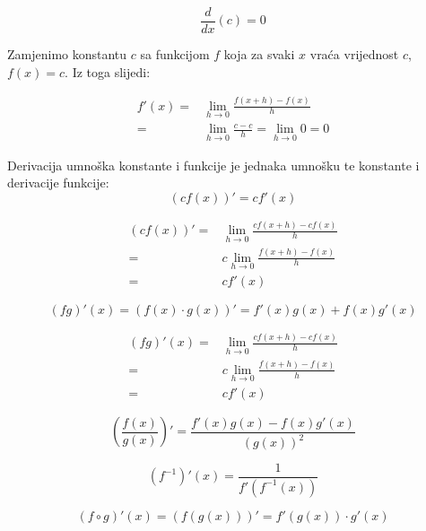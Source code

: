 \begin{multicols}{2}
\begin{propositionbox}
    $$
        \frac{d}{dx}(c) = 0
    $$
\end{propositionbox}

Zamjenimo konstantu $c$ sa funkcijom $f$ koja za svaki $x$ vraća vrijednost $c$, $f(x)=c$.
Iz toga slijedi:

\begin{align*}
    f'(x) =& \lim_{h\to 0}\frac{f(x+h)-f(x)}{h}\\
          =& \lim_{h\to 0}\frac{c - c}{h} = \lim_{h\to 0}0 = 0
\end{align*}

\begin{propositionbox}
    Derivacija umnoška konstante i funkcije je jednaka umnošku te konstante i derivacije funkcije:
    $$
        (cf(x))' = cf'(x)
    $$
\end{propositionbox}

\begin{align*}
    (cf(x))'=&\lim_{h\to 0}\frac{cf(x+h)-cf(x)}{h}\\
            =&c\lim_{h\to 0}\frac{f(x+h)-f(x)}{h}\\
            =&cf'(x)
\end{align*}

\end{multicols}

\begin{propositionbox}
    $$
        (fg)'(x) = (f(x)\cdot g(x))' = f'(x)g(x) + f(x)g'(x)
    $$
\end{propositionbox}

\begin{align*}
    (fg)'(x)=&\lim_{h\to 0}\frac{cf(x+h)-cf(x)}{h}\\
    =&c\lim_{h\to 0}\frac{f(x+h)-f(x)}{h}\\
    =&cf'(x)
\end{align*}

\begin{propositionbox}
    $$
        \left(\frac{f(x)}{g(x)}\right)' = \frac{f'(x)g(x) - f(x)g'(x)}{(g(x))^2}
    $$
\end{propositionbox}

\begin{propositionbox}
    $$
        (f^{-1})'(x) = \frac{1}{f'(f^{-1}(x))}
    $$
\end{propositionbox}

\begin{propositionbox}
    $$
        (f\circ g)'(x) = (f(g(x)))' = f'(g(x)) \cdot g'(x)
    $$
\end{propositionbox}

